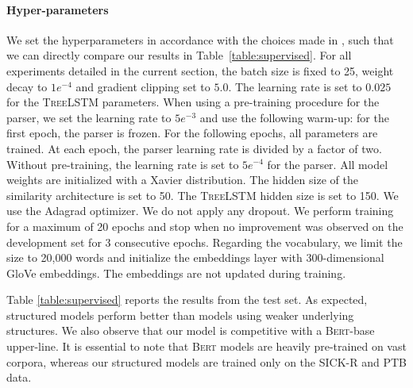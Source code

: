 \paragraph{Hyper-parameters} We set the hyperparameters in accordance with the choices made in \textcite{tai_15}, such that we can directly compare our results in Table~\ref{table:supervised}. For all experiments detailed in the current section, the batch size is fixed to 25, weight decay to $1e^{-4}$ and gradient clipping set to $5.0$. The learning rate is set to $0.025$ for the \textsc{TreeLSTM} parameters. When using a pre-training procedure for the parser, we set the learning rate to $5e^{-3}$ and use the following warm-up: for the first epoch, the parser is frozen. For the following epochs, all parameters are trained. At each epoch, the parser learning rate is divided by a factor of two. Without pre-training, the learning rate is set to $5e^{-4}$ for the parser. All model weights are initialized with a Xavier distribution. The hidden size of the similarity architecture is set to 50. The \textsc{TreeLSTM} hidden size is set to 150. We use the Adagrad optimizer. We do not apply any dropout. We perform training for a maximum of 20 epochs and stop when no improvement was observed on the development set for 3 consecutive epochs.
Regarding the vocabulary, we limit the size to 20,000 words and initialize the embeddings layer with 300-dimensional GloVe embeddings. The embeddings are not updated during training.



Table \ref{table:supervised} reports the results from the test set. As expected, structured models perform better than models using weaker underlying structures. We also observe that our model is competitive with a \textsc{Bert}-base upper-line. It is essential to note that \textsc{Bert} models are heavily pre-trained on vast corpora, whereas our structured models are trained only on the SICK-R and PTB data. 


